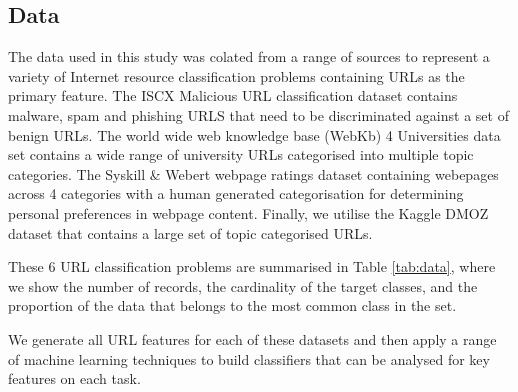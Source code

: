 \documentclass{aircc}
\begin{document}
\subsection{Data}
The data used in this study was colated from a range of sources to represent a variety of
Internet resource classification problems containing URLs as the primary feature.
The ISCX Malicious URL classification dataset contains malware, spam and phishing URLS
that need to be discriminated against a set of benign URLs\cite{Mamun2016}.
The world wide web knowledge base (WebKb) 4 Universities data set contains a wide
range of university URLs categorised into multiple topic categories\cite{Craven1998}.
The Syskill \& Webert webpage ratings dataset containing webepages across 4 categories
with a human generated categorisation for determining personal preferences in webpage
content\cite{Pazzani1996}. Finally, we utilise the Kaggle DMOZ dataset that contains
a large set of topic categorised URLs\cite{dmoz}.

These 6 URL classification problems are summarised in Table \ref{tab:data}, where we
show the number of records, the cardinality of the target classes, and the proportion
of the data that belongs to the most common class in the set.

\begin{table}
\caption{Datasets}
\fontsize{3pt}{3pt}\selectfont
\label{tab:data}
\end{table}

We generate all URL features for each of these datasets and then apply a range of 
machine learning
techniques to build classifiers that can be analysed for key features on each task.
\end{document}
